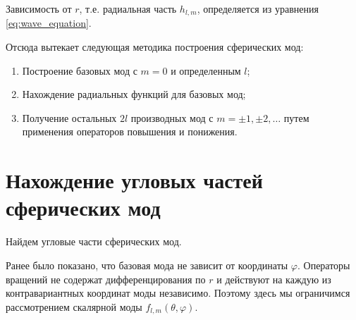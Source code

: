 \documentclass[12pt,a4paper]{article}
\begin{document}
        Зависимость от $r$, т.е. радиальная часть $h_{l, m}$, определяется из уравнения \autoref{eq:wave_equation}.

        Отсюда вытекает следующая методика построения сферических мод:
        \begin{enumerate}[noitemsep]
            \item Построение базовых мод с $m = 0$ и определенным $l$;
            \item Нахождение радиальных функций для базовых мод;
            \item Получение остальных $2l$ производных мод с $m = \pm 1, \pm 2, \dots$ путем применения операторов повышения и понижения.
        \end{enumerate}


    \section{Нахождение угловых частей сферических мод}

        Найдем угловые части сферических мод.

        Ранее было показано, что базовая мода не зависит от координаты $\varphi$. Операторы вращений не содержат дифференцирования по $r$ и действуют на каждую из контравариантных координат моды независимо. Поэтому здесь мы ограничимся рассмотрением скалярной моды $f_{l,m}(\theta, \varphi)$.
\end{document}
